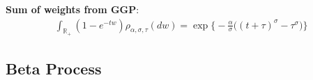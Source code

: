 \documentclass{article}
\begin{document}
\textbf{Sum of weights from GGP}:
\begin{align}
\int_{\mathbb{R}_+} (1- e^{-tw}) \rho_{\alpha, \sigma, \tau}(dw) = \exp\bigg\{-\frac{\alpha}{\sigma}\big((t+\tau)^\sigma - \tau^\sigma\big)\bigg\}
\end{align}

\subsection{Beta Process}




\end{document}
